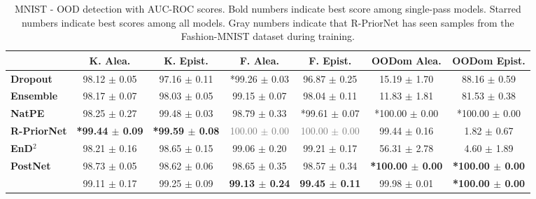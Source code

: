 \begin{table*}[ht]
    \centering
    \caption{MNIST - OOD detection with AUC-ROC scores. Bold numbers indicate best score among single-pass models. Starred numbers indicate best scores among all models. Gray numbers indicate that R-PriorNet has seen samples from the Fashion-MNIST dataset during training.}
    \label{tab:auroc-mnist}
    \scriptsize
    \begin{tabular}{lcccccc}
        \toprule
        & \textbf{K. Alea.} & \textbf{K. Epist.} & \textbf{F. Alea.} & \textbf{F. Epist.} & \textbf{OODom Alea.} & \textbf{OODom Epist.} \\
        \midrule
        \textbf{Dropout} & 98.12 $\pm$ 0.05 & 97.16 $\pm$ 0.11 & *99.26 $\pm$ 0.03 & 96.87 $\pm$ 0.25 & 15.19 $\pm$ 1.70 & 88.16 $\pm$ 0.59 \\
        \textbf{Ensemble} & 98.17 $\pm$ 0.07 & 98.03 $\pm$ 0.05 & 99.15 $\pm$ 0.07 & 98.04 $\pm$ 0.11 & 11.83 $\pm$ 1.81 & 81.53 $\pm$ 0.38 \\
        \textbf{NatPE} & 98.25 $\pm$ 0.27 & 99.48 $\pm$ 0.03 & 98.79 $\pm$ 0.33 & *99.61 $\pm$ 0.07 & *100.00 $\pm$ 0.00 & *100.00 $\pm$ 0.00 \\
        \midrule
        \textbf{R-PriorNet} & \textbf{*99.44 $\pm$ 0.09} & \textbf{*99.59 $\pm$ 0.08} & \textcolor{gray}{100.00 $\pm$ 0.00} & \textcolor{gray}{100.00 $\pm$ 0.00} & 99.44 $\pm$ 0.16 & 1.82 $\pm$ 0.67 \\
        \textbf{EnD$^2$} & 98.21 $\pm$ 0.16 & 98.65 $\pm$ 0.15 & 99.06 $\pm$ 0.20 & 99.21 $\pm$ 0.17 & 56.31 $\pm$ 2.78 & 4.60 $\pm$ 1.89 \\
        \textbf{PostNet} & 98.73 $\pm$ 0.05 & 98.62 $\pm$ 0.06 & 98.65 $\pm$ 0.35 & 98.57 $\pm$ 0.34 & \textbf{*100.00 $\pm$ 0.00} & \textbf{*100.00 $\pm$ 0.00} \\
        \textbf{\oursacro{}} & 99.11 $\pm$ 0.17 & 99.25 $\pm$ 0.09 & \textbf{99.13 $\pm$ 0.24} & \textbf{99.45 $\pm$ 0.11} & 99.98 $\pm$ 0.01 & \textbf{*100.00 $\pm$ 0.00} \\
        \bottomrule
    \end{tabular}
\end{table*}

